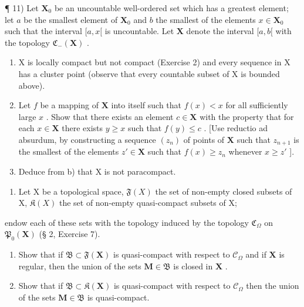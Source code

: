 ¶ 11) Let \(\mathbf{X}_0\) be an uncountable well-ordered set which has a greatest element; let \(a\) be the smallest element of \(\mathbf{X}_0\) and \(b\) the smallest of the elements \(x \in \mathbf{X}_0\) such that the interval \([a, x[\) is uncountable. Let \(\mathbf{X}\) denote the interval \([a, b[\) with the topology \(\mathfrak{C}_{-}(\mathbf{X})\) .

\begin{enumerate}
\def\labelenumi{\alph{enumi})}
\item
  X is locally compact but not compact (Exercise 2) and every sequence in X has a cluster point (observe that every countable subset of X is bounded above).
\item
  Let \(f\) be a mapping of \(\mathbf{X}\) into itself such that \(f(x) < x\) for all sufficiently large \(x\) . Show that there exists an element \(c \in \mathbf{X}\) with the property that for each \(x \in \mathbf{X}\) there exists \(y \geqslant x\) such that \(f(y) \leqslant c\) . {[}Use reductio ad absurdum, by constructing a sequence \((z_n)\) of points of \(\mathbf{X}\) such that \(z_{n+1}\) is the smallest of the elements \(z' \in \mathbf{X}\) such that \(f(x) \geqslant z_n\) whenever \(x \geqslant z'\) {]}.
\item
  Deduce from b) that X is not paracompact.
\end{enumerate}

\begin{enumerate}
\def\labelenumi{\arabic{enumi})}
\setcounter{enumi}{11}
\tightlist
\item
  Let X be a topological space, \(\mathfrak{F}(X)\) the set of non-empty closed subsets of X, \(\mathfrak{K}(X)\) the set of non-empty quasi-compact subsets of X;
\end{enumerate}

endow each of these sets with the topology induced by the topology \(\mathfrak{C}_{\Omega}\) on \(\mathfrak{P}_{0}(\mathbf{X})\) (§ 2, Exercise 7).

\begin{enumerate}
\def\labelenumi{\alph{enumi})}
\tightlist
\item
  Show that if \(\mathfrak{B} \subset \mathfrak{F}(\mathbf{X})\) is quasi-compact with respect to \(\mathcal{C}_{\Omega}\) and if \(\mathbf{X}\) is regular, then the union of the sets \(\mathbf{M} \in \mathfrak{B}\) is closed in \(\mathbf{X}\) .\\
\item
  Show that if \(\mathfrak{B} \subset \mathfrak{K}(\mathbf{X})\) is quasi-compact with respect to \(\mathcal{C}_{\Omega}\) then the union of the sets \(\mathbf{M} \in \mathfrak{B}\) is quasi-compact.
\end{enumerate}

